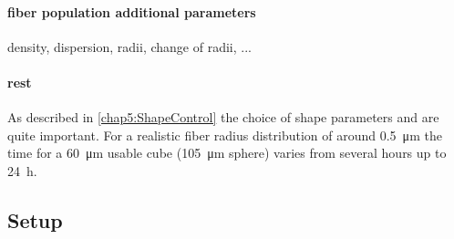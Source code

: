 \paragraph{fiber population additional parameters}
density, dispersion, radii, change of radii, ...
% 
\paragraph{rest}
% 
As described in \cref{chap5:ShapeControl} the choice of shape parameters \segLength and \segRadius are quite important. For a realistic fiber radius distribution of around \SI{0.5}{\micro\meter} the time for a \SI{60}{\micro\meter} usable cube (\SI{105}{\micro\meter} sphere) varies from several hours up to \SI{24}{\hour}.
% 
% 
\subsection{Setup}
% 

